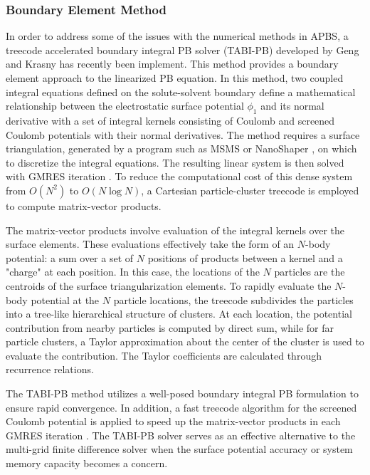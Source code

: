 \documentclass[journal=jpcbfk, manuscript=article]{achemso}
\begin{document}
\subsubsection{Boundary Element Method}
In order to address some of the issues with the numerical methods in APBS, a treecode accelerated boundary integral PB solver (TABI-PB) developed by Geng and Krasny \cite{geng2013} has recently been implement. This method provides a boundary element approach to the linearized PB equation. In this method, two coupled integral equations defined on the solute-solvent boundary define a mathematical relationship between the electrostatic surface potential $\phi_1$ and its normal derivative with a set of integral kernels consisting of Coulomb and screened Coulomb potentials with their normal derivatives. The method requires a surface triangulation, generated by a program such as MSMS \cite{sanner1995} or NanoShaper \cite{decherchi2013}, on which to discretize the integral equations. The resulting linear system is then solved with GMRES iteration \cite{saad1986}. To reduce the computational cost of this dense system from $O(N^2)$ to $O(N\log N)$, a Cartesian particle-cluster treecode is employed to compute matrix-vector products.

The matrix-vector products involve evaluation of the integral kernels over the surface elements. These evaluations effectively take the form of an $N$-body potential: a sum over a set of $N$ positions of products between a kernel and a "charge" at each position. In this case, the locations of the $N$ particles are the centroids of the surface triangularization elements. To rapidly evaluate the $N$-body potential at the $N$ particle locations, the treecode subdivides the particles into a tree-like hierarchical structure of clusters. At each location, the potential contribution from nearby particles is computed by direct sum, while for far particle clusters, a Taylor approximation about the center of the cluster is used to evaluate the contribution. The Taylor coefficients are calculated through recurrence relations. 

The TABI-PB method utilizes a well-posed boundary integral PB formulation to ensure rapid convergence. In addition, a fast treecode algorithm for the screened Coulomb potential \cite{Li2009} is applied to speed up the matrix-vector products in each GMRES iteration \cite{Juffer1991}. The TABI-PB solver serves as an effective alternative to the multi-grid finite difference solver when the surface potential accuracy or system memory capacity becomes a concern.
\end{document}
